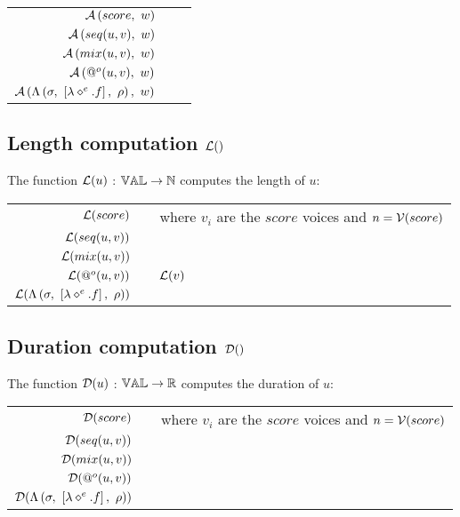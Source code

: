 \documentclass[10pt,a4paper,frenchb]{article}
\makeatletter
\newcommand{\evaltable}[1][$\rightarrow$]	  {\begin{center} \begin{tabular*}{\linewidth}{rc@{ #1 }l}}
\newcommand{\evaltablend}  		{\end{tabular*}\end{center}}
\makeatother
\begin{document}
\evaltable
 \hline
 $\mathcal A\left(score,\ w\right)$					& & \sapplyScore{score}{w} \\
 $\mathcal A\left(seq(u, v),\ w\right)$				& & \sapplySeq{u}{v}{w} \\
 $\mathcal A\left(mix(u, v),\ w\right)$ 			& & \sapplyMix{u}{v}{w} \\
 $\mathcal A\left(@^o (u,v),\ w\right)$ 			& & \sapplyApply{u}{v}{w} \\
 $\mathcal A\left(\Lambda\left(\sigma,\ \left[\lambda \diamond^e.f\right],\ \rho \right),\ w\right)$ 	& & \sapplyClosure{e}{f}{w} \\
 \hline
\evaltablend


\subsection{Length computation $\mathcal L()$}
The function $\mathcal L(u)$ : $\mathbb{VAL} \rightarrow \mathbb{N}$ computes the length of $u$:

\evaltable
 \hline
 $\mathcal L(score)$					& & \lengthScore \: where $v_i$ are the $score$ voices and $n=\mathcal V(score)$ \\
 $\mathcal L(seq(u, v))$			& & \lengthSeq{u}{v} \\
 $\mathcal L(mix(u, v))$ 			& & \lengthMix{u}{v} \\
 $\mathcal L(@^o (u,v))$ 		& & $\mathcal L(v)$ \\
 $\mathcal L(\Lambda\left(\sigma,\ \left[\lambda \diamond^e.f\right],\ \rho \right))$ 	& & \lengthClosure{e}{f}{\bounds} \\
 \hline
\evaltablend

\subsection{Duration computation $\mathcal D()$}
The function $\mathcal D(u)$ : $\mathbb{VAL} \rightarrow \mathbb{R}$ computes the duration of $u$:

\evaltable
 \hline
 $\mathcal D(score)$					& & \durScore \: where $v_i$ are the $score$ voices and $n=\mathcal V(score)$\\
 $\mathcal D(seq(u, v))$			& & \durSeq{u}{v} \\
 $\mathcal D(mix(u, v))$ 		& & \durMix{u}{v} \\
 $\mathcal D(@^o (u,v))$ 		& & \durApply{u}{v} \\
 $\mathcal D(\Lambda\left(\sigma,\ \left[\lambda \diamond^e.f\right],\ \rho \right))$ 	& & \durClosure{e}{f}{\bounds} \\
 \hline
\evaltablend
\end{document}
